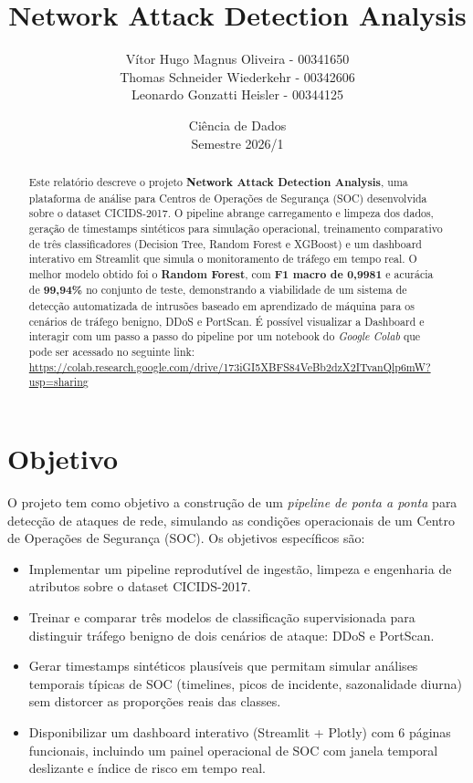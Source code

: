 \documentclass[12pt,a4paper]{article}
\title{Network Attack Detection Analysis}
\author{%
  Vítor Hugo Magnus Oliveira - 00341650 \\
  Thomas Schneider Wiederkehr - 00342606 \\
  Leonardo Gonzatti Heisler - 00344125
}
\date{Ciência de Dados \\ Semestre 2026/1}
\begin{document}

\maketitle
\thispagestyle{empty}
\newpage

\tableofcontents
\newpage

\begin{abstract}
\noindent
Este relatório descreve o projeto \textbf{Network Attack Detection Analysis}, uma plataforma de
análise para Centros de Operações de Segurança (SOC) desenvolvida sobre o
dataset CICIDS-2017. O pipeline abrange carregamento e limpeza dos dados,
geração de timestamps sintéticos para simulação operacional, treinamento
comparativo de três classificadores (Decision Tree, Random Forest e XGBoost)
e um dashboard interativo em Streamlit que simula o monitoramento de tráfego
em tempo real. O melhor modelo obtido foi o \textbf{Random Forest},
com \textbf{F1 macro de 0{,}9981} e acurácia de \textbf{99{,}94\%} no
conjunto de teste, demonstrando a viabilidade de um sistema de detecção
automatizada de intrusões baseado em aprendizado de máquina para os cenários
de tráfego benigno, DDoS e PortScan. É possível visualizar a Dashboard e interagir com um passo a passo do pipeline por um notebook do \textit{Google Colab} que pode ser acessado no seguinte link: \url{https://colab.research.google.com/drive/173iGI5XBFS84VeBb2dzX2ITvanQlp6mW?usp=sharing}
\end{abstract}

\section{Objetivo}

O projeto tem como objetivo a construção de um \emph{pipeline de ponta a ponta}
para detecção de ataques de rede, simulando as condições operacionais de um
Centro de Operações de Segurança (SOC). Os objetivos específicos são:

\begin{itemize}
  \item Implementar um pipeline reprodutível de ingestão, limpeza e engenharia
        de atributos sobre o dataset CICIDS-2017.
  \item Treinar e comparar três modelos de classificação supervisionada para
        distinguir tráfego benigno de dois cenários de ataque: DDoS e
        PortScan.
  \item Gerar timestamps sintéticos plausíveis que permitam simular análises
        temporais típicas de SOC (timelines, picos de incidente, sazonalidade
        diurna) sem distorcer as proporções reais das classes.
  \item Disponibilizar um dashboard interativo (Streamlit + Plotly) com 6
        páginas funcionais, incluindo um painel operacional de SOC com janela
        temporal deslizante e índice de risco em tempo real.
\end{itemize}
\end{document}

